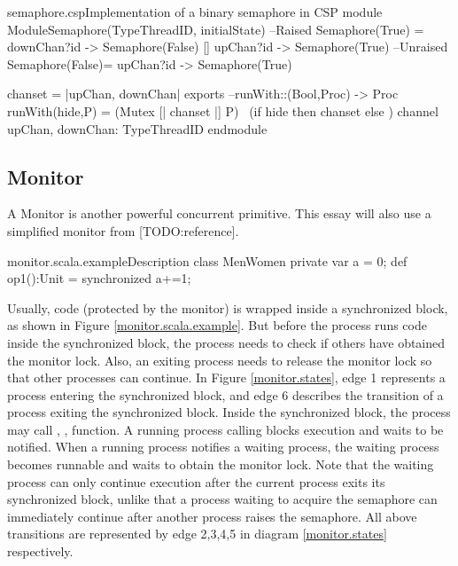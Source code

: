 \documentclass{article}
\begin{document}
\begin{cspinline}{semaphore.csp}{Implementation of a binary semaphore in CSP}
module ModuleSemaphore(TypeThreadID, initialState)
  --Raised
  Semaphore(True) = downChan?id -> Semaphore(False)
                   [] upChan?id -> Semaphore(True)
  --Unraised
  Semaphore(False)= upChan?id   -> Semaphore(True)
  
  chanset = {|upChan, downChan|}
exports
  --runWith::(Bool,Proc) -> Proc
  runWith(hide,P) = (Mutex [| chanset |] P) \ 
                     (if hide then chanset else {})
  channel upChan, downChan: TypeThreadID
endmodule
\end{cspinline}

\subsection{Monitor}
A Monitor is another powerful concurrent primitive. This essay will also use a simplified monitor from [TODO:reference].

\begin{scalainline}{monitor.scala.example}{Description}
class MenWomen {
  private var a = 0;
  def op1():Unit = synchronized{
    a+=1;
  }
}
\end{scalainline}

Usually, code (protected by the monitor) is wrapped inside a synchronized block, as shown in Figure \ref{monitor.scala.example}. But before the process runs code inside the synchronized block, the process needs to check if others have obtained the monitor lock. Also, an exiting process needs to release the monitor lock so that other processes can continue. In Figure \ref{monitor.states}, edge 1 represents a process entering the synchronized block, and edge 6 describes the transition of a process exiting the synchronized block. Inside the synchronized block, the process may call , ,  function. A running process calling  blocks execution and waits to be notified. When a running process notifies a waiting process, the waiting process becomes runnable and waits to obtain the monitor lock. Note that the waiting process can only continue execution after the current process exits its synchronized block, unlike that a process waiting to acquire the semaphore can immediately continue after another process raises the semaphore. All above transitions are represented by edge 2,3,4,5 in diagram \ref{monitor.states} respectively. 
\end{document}
